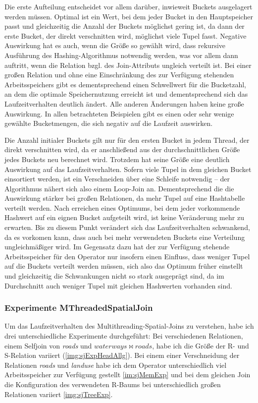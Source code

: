 \documentclass[a4paper,12pt,twoside]{article}
\newcommand{\Fb}[1]{\textit{#1}} %
\begin{document}
{Die erste Aufteilung entscheidet vor allem darüber, inwieweit Buckets ausgelagert werden müssen. Optimal ist ein Wert, bei dem jeder Bucket in den Hauptspeicher passt und gleichzeitig die Anzahl der Buckets möglichst gering ist, da dann der erste Bucket, der direkt verschnitten wird, möglichst viele Tupel fasst. Negative Auswirkung hat es auch, wenn die Größe so gewählt wird, dass rekursive Ausführung des Hashing-Algorithmus notwendig werden, was vor allem dann auftritt, wenn die Relation bzgl. des Join-Attributs ungleich verteilt ist. Bei einer großen Relation und ohne eine Einschränkung des zur Verfügung stehenden Arbeitsspeichers gibt es dementsprechend einen Schwellwert für die Bucketzahl, an dem die optimale Speichernutzung erreicht ist und dementsprechend sich das Laufzeitverhalten deutlich ändert. Alle anderen Änderungen haben keine große Auswirkung. In allen betrachteten Beispielen gibt es einen oder sehr wenige gewählte Bucketmengen, die sich negativ auf die Laufzeit auswirken.

Die Anzahl initialer Buckets gilt nur für den ersten Bucket in jedem Thread, der direkt verschnitten wird, da er anschließend aus der durchschnittlichen Größe jedes Buckets neu berechnet wird. Trotzdem hat seine Größe eine deutlich Auswirkung auf das Laufzeitverhalten. Sofern viele Tupel in dem gleichen Bucket einsortiert werden, ist ein Verschneiden über eine Schleife notwendig -- der Algorithmus nähert sich also einem Loop-Join an. Dementsprechend die die Auswirkung stärker bei großen Relationen, da mehr Tupel auf eine Hashtabelle verteilt werden. Nach erreichen eines Optimums, bei dem jeder vorkommende Hashwert auf ein eignen Bucket aufgeteilt wird, ist keine Veränderung mehr zu erwarten. Bis zu diesem Punkt verändert sich das Laufzeitverhalten schwankend, da es vorkomen kann, dass auch bei mehr verwendeten Buckets eine Verteilung ungleichmäßiger wird. Im Gegensatz dazu hat der zur Verfügung stehende Arbeitsspeicher für den Operator nur insofern einen Einfluss, dass weniger Tupel auf die Buckets verteilt werden müssen, sich also das Optimum früher einstellt und gleichzeitig die Schwankungen nicht so stark ausgeprägt sind, da im Durchschnitt auch weniger Tupel mit gleichen Hashwerten vorhanden sind.

\subsubsection{Experimente MThreadedSpatialJoin}
\label{exp:sj}

Um das Laufzeitverhalten des Multithreading-Spatial-Joins zu verstehen, habe ich drei unterschiedliche Experimente durchgeführt: Bei verschiedenen Relationen, einem Selfjoin von \Fb{roads} und $waterways \bowtie roads$, habe ich die Größe der R- und S-Relation variiert (\autoref{img:sjExpHeadAllg}). Bei einem einer Verschneidung der Relationen \Fb{roads} und \Fb{landuse} habe ich dem Operator unterschiedlich viel Arbeitsspeicher zur Verfügung gestellt \autoref{im:sjMemExp} und bei dem gleichen Join die Konfiguration des verwendeten R-Baums bei unterschiedlich großen Relationen variiert \autoref{img:sjTreeExp}.

}
\end{document}
